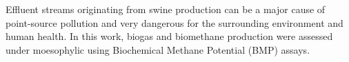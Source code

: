 Effluent streams originating from swine production can be a major cause of point-source pollution and very dangerous for the surrounding environment and human health. In this work, biogas and biomethane production were assessed under moesophylic using Biochemical Methane Potential (BMP) assays.